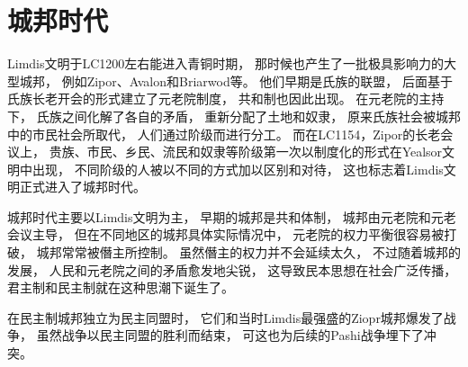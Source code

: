 \documentclass[UTF8,12pt,draft]{ctexbook}
\begin{document}


            
            
        \section{城邦时代}

            Limdis文明于LC1200左右能进入青铜时期，
            那时候也产生了一批极具影响力的大型城邦，
            例如Zipor、Avalon和Briarwod等。
            他们早期是氏族的联盟，
            后面基于氏族长老开会的形式建立了元老院制度，
            共和制也因此出现。
            在元老院的主持下，
            氏族之间化解了各自的矛盾，
            重新分配了土地和奴隶，
            原来氏族社会被城邦中的市民社会所取代，
            人们通过阶级而进行分工。
            而在LC1154，Zipor的长老会议上，
            贵族、市民、乡民、流民和奴隶等阶级第一次以制度化的形式在Yealsor文明中出现，
            不同阶级的人被以不同的方式加以区别和对待，
            这也标志着Limdis文明正式进入了城邦时代。


            城邦时代主要以Limdis文明为主，
            早期的城邦是共和体制，
            城邦由元老院和元老会议主导，
            但在不同地区的城邦具体实际情况中，
            元老院的权力平衡很容易被打破，
            城邦常常被僭主所控制。
            虽然僭主的权力并不会延续太久，
            不过随着城邦的发展，
            人民和元老院之间的矛盾愈发地尖锐，
            这导致民本思想在社会广泛传播，
            君主制和民主制就在这种思潮下诞生了。

            在民主制城邦独立为民主同盟时，
            它们和当时Limdis最强盛的Ziopr城邦爆发了战争，
            虽然战争以民主同盟的胜利而结束，
            可这也为后续的Pashi战争埋下了冲突。
\end{document}

